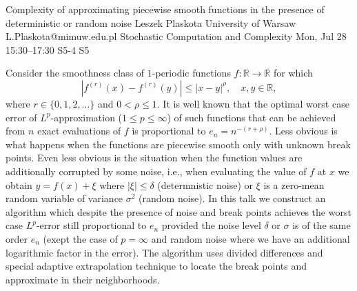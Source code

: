 \begin{talk}
  {Complexity of approximating piecewise smooth functions in the presence of deterministic or random noise}%
  {Leszek Plaskota}%
  {University of Warsaw}%
  {L.Plaskota@mimuw.edu.pl}%
  {Stochastic Computation and Complexity}%
  {}%
  {Mon, Jul 28 15:30–17:30}%
  {S5-4}%
  {S5}%
				
			
Consider the smoothness class of $1$-periodic functions $f:\mathbb R\to\mathbb R$ for which 
$$|f^{(r)}(x)-f^{(r)}(y)|\le |x-y|^\rho,\quad x,y\in\mathbb R,$$ 
where $r\in\{0,1,2,\ldots\}$ and $0<\rho\le 1.$ It is well known that the optimal worst case error of $L^p$-approximation ($1\le p\le\infty$) of such functions that can be achieved from $n$ exact evaluations of $f$ is proportional to $e_n=n^{-(r+\rho)}.$ Less obvious is what happens when the functions are piecewise smooth only with unknown break points. Even less obvious is the situation when the function values are additionally corrupted by some noise, i.e., when evaluating the value of $f$ at $x$ we obtain $y=f(x)+\xi$ where $|\xi|\le\delta$ (determnistic noise) or $\xi$ is a zero-mean random variable of variance $\sigma^2$ (random noise). In this talk we construct an algorithm which despite the presence of noise and break points achieves the worst case $L^p$-error still proportional to $e_n$ provided the noise level $\delta$ or $\sigma$ is of the same order $e_n$ (exept the case of $p=\infty$ and random noise where we have an additional logarithmic factor in the error). The algorithm uses divided differences and special adaptive extrapolation technique to locate the break points and approximate in their neighborhoods. 

\end{talk}

